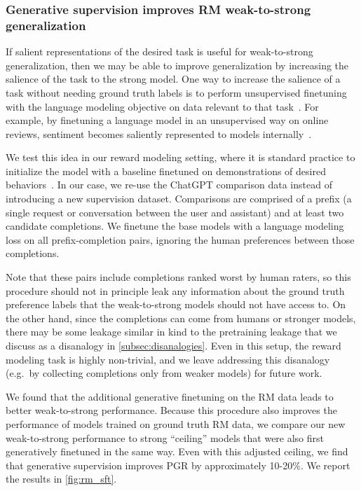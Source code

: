 \subsubsection{Generative supervision improves RM weak-to-strong generalization}
\label{sec:rm-sft}

If salient representations of the desired task is useful for weak-to-strong generalization, then we may be able to improve generalization by increasing the salience of the task to the strong model. One way to increase the salience of a task without needing ground truth labels is to perform unsupervised finetuning with the language modeling objective on data relevant to that task~\citep{dai2015semi}. For example, by finetuning a language model in an unsupervised way on online reviews, sentiment becomes saliently represented to models internally~\citep{radford2017learning}.

We test this idea in our reward modeling setting, where it is standard practice to initialize the model with a baseline finetuned on demonstrations of desired behaviors~\citep{stiennon2020learning}. In our case, we re-use the ChatGPT comparison data instead of introducing a new supervision dataset. Comparisons are comprised of a prefix (a single request or conversation between the user and assistant) and at least two candidate completions. We finetune the base models with a language modeling loss on all prefix-completion pairs, ignoring the human preferences between those completions.

Note that these pairs include completions ranked worst by human raters, so this procedure should not in principle leak any information about the ground truth preference labels that the weak-to-strong models should not have access to. On the other hand, since the completions can come from humans or stronger models, there may be some leakage similar in kind to the pretraining leakage that we discuss as a disanalogy in \ref{subsec:disanalogies}.  
Even in this setup, the reward modeling task is highly non-trivial, and we leave addressing this disanalogy (e.g.~by collecting completions only from weaker models) for future work.

We found that the additional generative finetuning on the RM data leads to better weak-to-strong performance. Because this procedure also improves the performance of models trained on ground truth RM data, we compare our new weak-to-strong performance to strong ``ceiling'' models that were also first generatively finetuned in the same way. Even with this adjusted ceiling, we find that generative supervision improves PGR by approximately 10-20\%.  We report the results in \ref{fig:rm_sft}.

